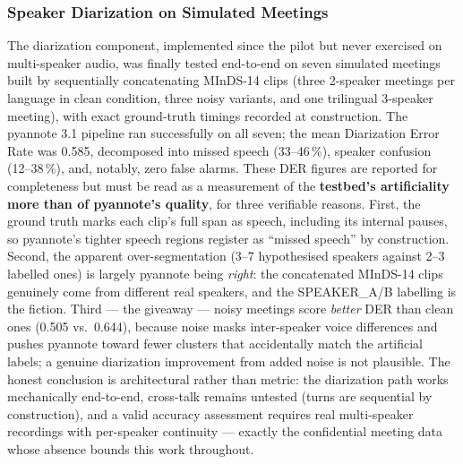 \documentclass[12pt]{report}
\begin{document}
\subsubsection{Speaker Diarization on Simulated Meetings}
The diarization component, implemented since the pilot but never exercised on multi-speaker audio, was finally tested end-to-end on seven simulated meetings built by sequentially concatenating MInDS-14 clips (three 2-speaker meetings per language in clean condition, three noisy variants, and one trilingual 3-speaker meeting), with exact ground-truth timings recorded at construction. The pyannote 3.1 pipeline ran successfully on all seven; the mean Diarization Error Rate was 0.585, decomposed into missed speech (33--46\,\%), speaker confusion (12--38\,\%), and, notably, zero false alarms.
These DER figures are reported for completeness but must be read as a measurement of the \textbf{testbed's artificiality more than of pyannote's quality}, for three verifiable reasons. First, the ground truth marks each clip's full span as speech, including its internal pauses, so pyannote's tighter speech regions register as \enquote{missed speech} by construction. Second, the apparent over-segmentation (3--7 hypothesised speakers against 2--3 labelled ones) is largely pyannote being \emph{right}: the concatenated MInDS-14 clips genuinely come from different real speakers, and the SPEAKER\_A/B labelling is the fiction. Third --- the giveaway --- noisy meetings score \emph{better} DER than clean ones (0.505 vs.\ 0.644), because noise masks inter-speaker voice differences and pushes pyannote toward fewer clusters that accidentally match the artificial labels; a genuine diarization improvement from added noise is not plausible. The honest conclusion is architectural rather than metric: the diarization path works mechanically end-to-end, cross-talk remains untested (turns are sequential by construction), and a valid accuracy assessment requires real multi-speaker recordings with per-speaker continuity --- exactly the confidential meeting data whose absence bounds this work throughout.
\end{document}
